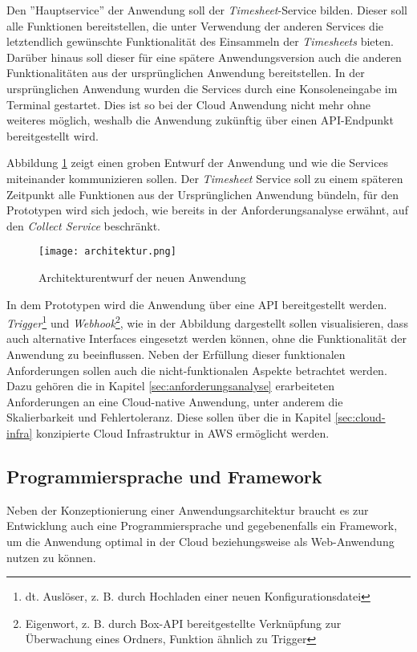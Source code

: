 Den ''Hauptservice'' der Anwendung soll der \textit{\gls{Timesheet}}-Service bilden. Dieser soll alle Funktionen bereitstellen, die unter Verwendung der anderen Services die letztendlich gewünschte Funktionalität des Einsammeln der \textit{\glspl{Timesheet}} bieten. Darüber hinaus soll dieser für eine spätere Anwendungsversion auch die anderen Funktionalitäten aus der ursprünglichen Anwendung bereitstellen. In der ursprünglichen Anwendung wurden die Services durch eine Konsoleneingabe im Terminal gestartet. Dies ist so bei der Cloud Anwendung nicht mehr ohne weiteres möglich, weshalb die Anwendung zukünftig über einen \ac{API}-Endpunkt bereitgestellt wird. \pagebreak

Abbildung \ref{fig:Architektur} zeigt einen groben  Entwurf der Anwendung und wie die Services miteinander kommunizieren sollen. Der \textit{\gls{Timesheet}} Service soll zu einem späteren Zeitpunkt alle Funktionen aus der Ursprünglichen Anwendung bündeln, für den Prototypen wird sich jedoch, wie bereits in der Anforderungsanalyse erwähnt, auf den \textit{Collect Service} beschränkt.

\begin{figure}[H]
    \centering
    \texttt{[image: architektur.png]}
    \caption{Architekturentwurf der neuen Anwendung}
    \label{fig:Architektur}
\end{figure}

In dem Prototypen wird die Anwendung über eine \ac{API} bereitgestellt werden. \textit{Trigger}\footnote{dt. Auslöser, z. B. durch Hochladen einer neuen Konfigurationsdatei} und \textit{Webhook}\footnote{Eigenwort, z. B. durch \gls{Box}-API bereitgestellte Verknüpfung zur Überwachung eines Ordners, Funktion ähnlich zu Trigger}, wie in der Abbildung dargestellt sollen visualisieren, dass auch alternative Interfaces eingesetzt werden können, ohne die Funktionalität der Anwendung zu beeinflussen. Neben der Erfüllung dieser funktionalen Anforderungen sollen auch die nicht-funktionalen Aspekte betrachtet werden. Dazu gehören die in Kapitel \ref{sec:anforderungsanalyse} erarbeiteten Anforderungen an eine Cloud-native Anwendung, unter anderem die Skalierbarkeit und Fehlertoleranz. Diese sollen über die in Kapitel \ref{sec:cloud-infra} konzipierte Cloud Infrastruktur in \ac{AWS} ermöglicht werden. \pagebreak

\subsection{Programmiersprache und Framework}
Neben der Konzeptionierung einer Anwendungsarchitektur braucht es zur Entwicklung auch eine Programmiersprache und gegebenenfalls ein Framework, um die Anwendung optimal in der Cloud beziehungsweise als Web-Anwendung nutzen zu können. 

